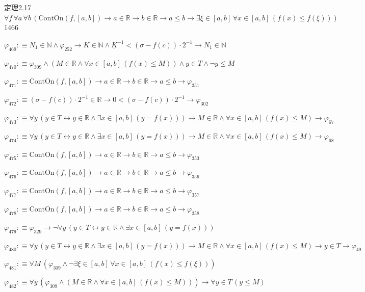 \begin{fullproof}{定理2.17}{$\forall f\,\forall a\,\forall b\,(\mathrm{ContOn}(f,[a,b]) \to a \in \mathbb{R} \to b \in \mathbb{R} \to a \leq b \to \exists \xi \in [a,b]\,\forall x \in [a,b]\,(f(x) \leq f(\xi)))$}{1466}
\begin{abbrevlist}
\item $\varphi_{469} :\equiv N_{1} \in \mathbb{N} \land \varphi_{252} \to K \in \mathbb{N} \land \underline{K}^{-1} < (\sigma - f(c)) \cdot 2^{-1} \to N_{1} \in \mathbb{N}$
\item $\varphi_{470} :\equiv \varphi_{309} \land (M \in \mathbb{R} \land \forall x \in [a,b]\,(f(x) \leq M)) \land y \in T \land \neg y \leq M$
\item $\varphi_{471} :\equiv \mathrm{ContOn}(f,[a,b]) \to a \in \mathbb{R} \to b \in \mathbb{R} \to a \leq b \to \varphi_{351}$
\item $\varphi_{472} :\equiv (\sigma - f(c)) \cdot 2^{-1} \in \mathbb{R} \to 0 < (\sigma - f(c)) \cdot 2^{-1} \to \varphi_{302}$
\item $\varphi_{473} :\equiv \forall y\,(y \in T \leftrightarrow y \in \mathbb{R} \land \exists x \in [a,b]\,(y = f(x))) \to M \in \mathbb{R} \land \forall x \in [a,b]\,(f(x) \leq M) \to \varphi_{67}$
\item $\varphi_{474} :\equiv \forall y\,(y \in T \leftrightarrow y \in \mathbb{R} \land \exists x \in [a,b]\,(y = f(x))) \to M \in \mathbb{R} \land \forall x \in [a,b]\,(f(x) \leq M) \to \varphi_{68}$
\item $\varphi_{475} :\equiv \mathrm{ContOn}(f,[a,b]) \to a \in \mathbb{R} \to b \in \mathbb{R} \to a \leq b \to \varphi_{353}$
\item $\varphi_{476} :\equiv \mathrm{ContOn}(f,[a,b]) \to a \in \mathbb{R} \to b \in \mathbb{R} \to a \leq b \to \varphi_{356}$
\item $\varphi_{477} :\equiv \mathrm{ContOn}(f,[a,b]) \to a \in \mathbb{R} \to b \in \mathbb{R} \to a \leq b \to \varphi_{357}$
\item $\varphi_{478} :\equiv \mathrm{ContOn}(f,[a,b]) \to a \in \mathbb{R} \to b \in \mathbb{R} \to a \leq b \to \varphi_{358}$
\item $\varphi_{479} :\equiv \varphi_{329} \to \neg \forall y\,(y \in T \leftrightarrow y \in \mathbb{R} \land \exists x \in [a,b]\,(y = f(x)))$
\item $\varphi_{480} :\equiv \forall y\,(y \in T \leftrightarrow y \in \mathbb{R} \land \exists x \in [a,b]\,(y = f(x))) \to M \in \mathbb{R} \land \forall x \in [a,b]\,(f(x) \leq M) \to y \in T \to \varphi_{49}$
\item $\varphi_{481} :\equiv \forall M\,(\varphi_{309} \land \neg \exists \xi \in [a,b]\,\forall x \in [a,b]\,(f(x) \leq f(\xi)))$
\item $\varphi_{482} :\equiv \forall y\,(\varphi_{309} \land (M \in \mathbb{R} \land \forall x \in [a,b]\,(f(x) \leq M))) \to \forall y \in T\,(y \leq M)$

\end{abbrevlist}
\end{fullproof}

